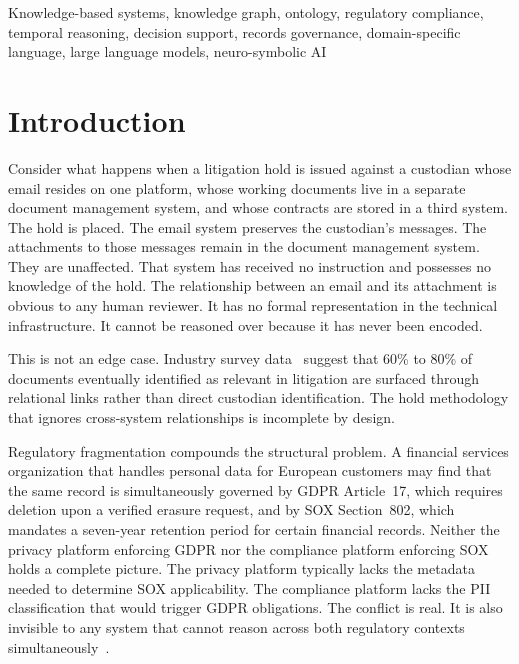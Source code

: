 \documentclass{ieeeaccess}
\begin{document}
\begin{keywords}
Knowledge-based systems, knowledge graph, ontology, regulatory compliance, temporal reasoning, decision support, records governance, domain-specific language, large language models, neuro-symbolic AI
\end{keywords}

\section{Introduction}

Consider what happens when a litigation hold is issued against a custodian whose email resides on one platform, whose working documents live in a separate document management system, and whose contracts are stored in a third system. The hold is placed. The email system preserves the custodian's messages. The attachments to those messages remain in the document management system. They are unaffected. That system has received no instruction and possesses no knowledge of the hold. The relationship between an email and its attachment is obvious to any human reviewer. It has no formal representation in the technical infrastructure. It cannot be reasoned over because it has never been encoded.

This is not an edge case. Industry survey data~\cite{sedona2019} suggest that 60\% to 80\% of documents eventually identified as relevant in litigation are surfaced through relational links rather than direct custodian identification. The hold methodology that ignores cross-system relationships is incomplete by design.

Regulatory fragmentation compounds the structural problem. A financial services organization that handles personal data for European customers may find that the same record is simultaneously governed by GDPR Article~17, which requires deletion upon a verified erasure request, and by SOX Section~802, which mandates a seven-year retention period for certain financial records. Neither the privacy platform enforcing GDPR nor the compliance platform enforcing SOX holds a complete picture. The privacy platform typically lacks the metadata needed to determine SOX applicability. The compliance platform lacks the PII classification that would trigger GDPR obligations. The conflict is real. It is also invisible to any system that cannot reason across both regulatory contexts simultaneously~\cite{edrm,iso15489,zubulake}.
\end{document}
